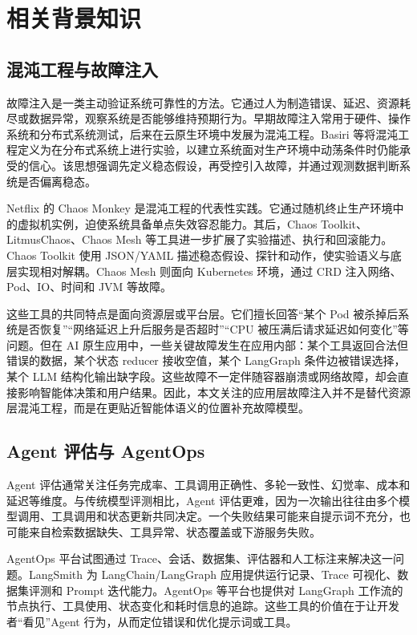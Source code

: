 \chapter{相关背景知识}

\section{混沌工程与故障注入}

故障注入是一类主动验证系统可靠性的方法。它通过人为制造错误、延迟、资源耗尽或数据异常，观察系统是否能够维持预期行为。早期故障注入常用于硬件、操作系统和分布式系统测试，后来在云原生环境中发展为混沌工程。Basiri 等将混沌工程定义为在分布式系统上进行实验，以建立系统面对生产环境中动荡条件时仍能承受的信心\cite{basiri2016chaos}。该思想强调先定义稳态假设，再受控引入故障，并通过观测数据判断系统是否偏离稳态。

Netflix 的 Chaos Monkey 是混沌工程的代表性实践。它通过随机终止生产环境中的虚拟机实例，迫使系统具备单点失效容忍能力\cite{netflixChaosMonkey}。其后，Chaos Toolkit、LitmusChaos、Chaos Mesh 等工具进一步扩展了实验描述、执行和回滚能力。Chaos Toolkit 使用 JSON/YAML 描述稳态假设、探针和动作，使实验语义与底层实现相对解耦\cite{chaosToolkit}。Chaos Mesh 则面向 Kubernetes 环境，通过 CRD 注入网络、Pod、IO、时间和 JVM 等故障。

这些工具的共同特点是面向资源层或平台层。它们擅长回答“某个 Pod 被杀掉后系统是否恢复”“网络延迟上升后服务是否超时”“CPU 被压满后请求延迟如何变化”等问题。但在 AI 原生应用中，一些关键故障发生在应用内部：某个工具返回合法但错误的数据，某个状态 reducer 接收空值，某个 LangGraph 条件边被错误选择，某个 LLM 结构化输出缺字段。这些故障不一定伴随容器崩溃或网络故障，却会直接影响智能体决策和用户结果。因此，本文关注的应用层故障注入并不是替代资源层混沌工程，而是在更贴近智能体语义的位置补充故障模型。

\section{Agent 评估与 AgentOps}

Agent 评估通常关注任务完成率、工具调用正确性、多轮一致性、幻觉率、成本和延迟等维度。与传统模型评测相比，Agent 评估更难，因为一次输出往往由多个模型调用、工具调用和状态更新共同决定。一个失败结果可能来自提示词不充分，也可能来自检索数据缺失、工具异常、状态覆盖或下游服务失败。

AgentOps 平台试图通过 Trace、会话、数据集、评估器和人工标注来解决这一问题。LangSmith 为 LangChain/LangGraph 应用提供运行记录、Trace 可视化、数据集评测和 Prompt 迭代能力\cite{langsmithDocs}。AgentOps 等平台也提供对 LangGraph 工作流的节点执行、工具使用、状态变化和耗时信息的追踪\cite{agentopsLangGraph}。这些工具的价值在于让开发者“看见”Agent 行为，从而定位错误和优化提示词或工具。


